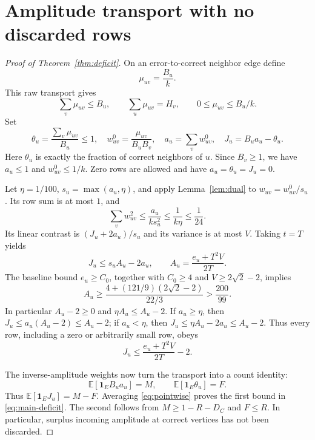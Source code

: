 \documentclass[11pt]{article}
\newcommand{\E}{\mathbb E}
\newcommand{\1}{\mathbf 1}
\begin{document}
\section{Amplitude transport with no discarded rows}
\begin{proof}[Proof of Theorem~\ref{thm:deficit}]
On an error-to-correct neighbor edge define
\begin{equation}\label{eq:flow}
 \mu_{uv}=\frac{B_u}{k}.
\end{equation}
This raw transport gives
\[
 \sum_v\mu_{uv}\le B_u,\qquad
 \sum_u\mu_{uv}=H_v,\qquad
 0\le\mu_{uv}\le B_u/k.
\]
Set
\[
 \theta_u=\frac{\sum_v\mu_{uv}}{B_u}\le1,\quad
 w^0_{uv}=\frac{\mu_{uv}}{B_uB_v},\quad
 a_u=\sum_vw^0_{uv},\quad J_u=B_ua_u-\theta_u.
\]
Here $\theta_u$ is exactly the fraction of correct neighbors of $u$.
Since $B_v\ge1$, we have $a_u\le1$ and $w^0_{uv}\le1/k$.
Zero rows are allowed and have $a_u=\theta_u=J_u=0$.

Let $\eta=1/100$, $s_u=\max(a_u,\eta)$, and apply
Lemma~\ref{lem:dual} to $w_{uv}=w^0_{uv}/s_u$. Its row sum is at most
$1$, and
\[
 \sum_vw_{uv}^2\le\frac{a_u}{ks_u^2}
                  \le\frac1{k\eta}\le\frac1{24}.
\]
Its linear contrast is $(J_u+2a_u)/s_u$ and its variance is at most
$V$. Taking $t=T$ yields
\[
 J_u\le s_u A_u-2a_u,\qquad
 A_u=\frac{e_u+T^2V}{2T}.
\]
The baseline bound $e_u\ge C_0$, together with $C_0\ge4$ and
$V\ge2\sqrt2-2$, implies
\[
 A_u\ge\frac{4+(121/9)(2\sqrt2-2)}{22/3}>\frac{200}{99}.
\]
In particular $A_u-2\ge0$ and $\eta A_u\le A_u-2$. If
$a_u\ge\eta$, then $J_u\le a_u(A_u-2)\le A_u-2$; if
$a_u<\eta$, then $J_u\le\eta A_u-2a_u\le A_u-2$.
Thus every row, including a zero or arbitrarily small row, obeys
\begin{equation}\label{eq:pointwise}
 J_u\le\frac{e_u+T^2V}{2T}-2.
\end{equation}

The inverse-amplitude weights now turn the transport into a count
identity:
\[
 \E[\1_E B_ua_u]=M,\qquad \E[\1_E\theta_u]=F.
\]
Thus $\E[\1_EJ_u]=M-F$. Averaging \eqref{eq:pointwise} proves
the first bound in \eqref{eq:main-deficit}. The second follows from
$M\ge1-R-D_C$ and $F\le R$. In particular, surplus incoming amplitude
at correct vertices has not been discarded.
\end{proof}
\end{document}
